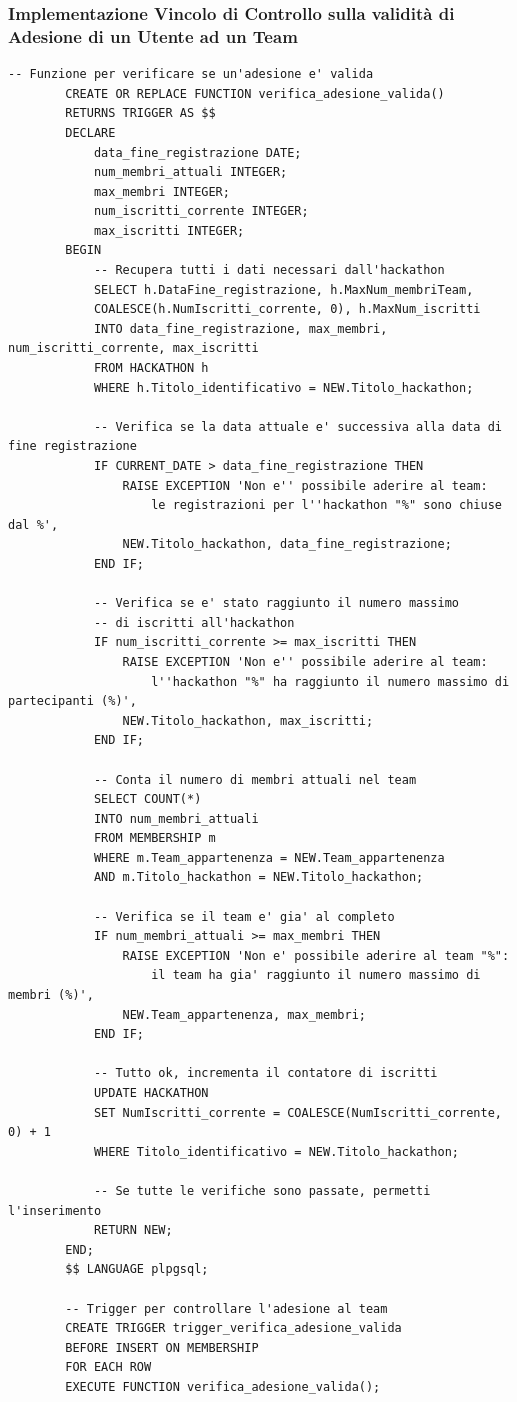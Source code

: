 \documentclass[a4paper, 11pt]{article}
\begin{document}
	\subsubsection{Implementazione Vincolo di Controllo sulla validità di Adesione di un Utente ad un Team}
	\begin{lstlisting}[style=sqlstyle]
		-- Funzione per verificare se un'adesione e' valida
		CREATE OR REPLACE FUNCTION verifica_adesione_valida()
		RETURNS TRIGGER AS $$
		DECLARE
			data_fine_registrazione DATE;
			num_membri_attuali INTEGER;
			max_membri INTEGER;
			num_iscritti_corrente INTEGER;
			max_iscritti INTEGER;
		BEGIN
			-- Recupera tutti i dati necessari dall'hackathon
			SELECT h.DataFine_registrazione, h.MaxNum_membriTeam, 
			COALESCE(h.NumIscritti_corrente, 0), h.MaxNum_iscritti
			INTO data_fine_registrazione, max_membri, num_iscritti_corrente, max_iscritti
			FROM HACKATHON h
			WHERE h.Titolo_identificativo = NEW.Titolo_hackathon;
			
			-- Verifica se la data attuale e' successiva alla data di fine registrazione
			IF CURRENT_DATE > data_fine_registrazione THEN
				RAISE EXCEPTION 'Non e'' possibile aderire al team: 
					le registrazioni per l''hackathon "%" sono chiuse dal %',
				NEW.Titolo_hackathon, data_fine_registrazione;
			END IF;
			
			-- Verifica se e' stato raggiunto il numero massimo 
			-- di iscritti all'hackathon
			IF num_iscritti_corrente >= max_iscritti THEN
				RAISE EXCEPTION 'Non e'' possibile aderire al team: 
					l''hackathon "%" ha raggiunto il numero massimo di partecipanti (%)',
				NEW.Titolo_hackathon, max_iscritti;
			END IF;
			
			-- Conta il numero di membri attuali nel team
			SELECT COUNT(*)
			INTO num_membri_attuali
			FROM MEMBERSHIP m
			WHERE m.Team_appartenenza = NEW.Team_appartenenza
			AND m.Titolo_hackathon = NEW.Titolo_hackathon;
			
			-- Verifica se il team e' gia' al completo
			IF num_membri_attuali >= max_membri THEN
				RAISE EXCEPTION 'Non e' possibile aderire al team "%": 
					il team ha gia' raggiunto il numero massimo di membri (%)',
				NEW.Team_appartenenza, max_membri;
			END IF;
			
			-- Tutto ok, incrementa il contatore di iscritti
			UPDATE HACKATHON
			SET NumIscritti_corrente = COALESCE(NumIscritti_corrente, 0) + 1
			WHERE Titolo_identificativo = NEW.Titolo_hackathon;
			
			-- Se tutte le verifiche sono passate, permetti l'inserimento
			RETURN NEW;
		END;
		$$ LANGUAGE plpgsql;
		
		-- Trigger per controllare l'adesione al team
		CREATE TRIGGER trigger_verifica_adesione_valida
		BEFORE INSERT ON MEMBERSHIP
		FOR EACH ROW
		EXECUTE FUNCTION verifica_adesione_valida();
	\end{lstlisting}
\end{document}
